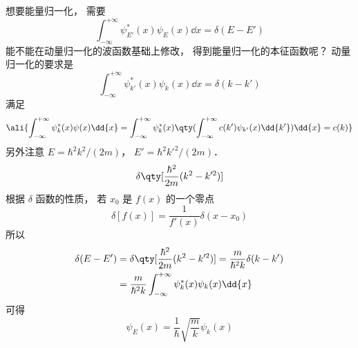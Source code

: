 想要能量归一化， 需要
\begin{equation}
\int_{-\infty}^{+\infty} \psi_{E'}^*(x) \psi_E(x) \dd{x}  = \delta (E - E')
\end{equation}
能不能在动量归一化的波函数基础上修改， 得到能量归一化的本征函数呢？
动量归一化的要求是
\begin{equation}
\int_{-\infty}^{+\infty} \psi_{k'}^*(x) \psi_k(x) \dd{x}  = \delta(k - k')
\end{equation}
满足
\begin{equation}\ali{
\int_{-\infty}^{+\infty} \psi_k^*(x) \psi(x) \dd{x}
= \int_{-\infty}^{+\infty} \psi_k^*(x) \qty(\int_{-\infty}^{+\infty} c(k')\psi_{k'}(x) \dd{k'}) \dd{x}
= c(k)
}\end{equation}
另外注意 $E = \hbar ^2 k^2/(2m)$， $E' = \hbar^2k'^2/(2m)$． 
\begin{equation}
\delta \qty[ \frac{\hbar ^2}{2m}(k^2 - k'^2)]
\end{equation}
根据 $\delta $ 函数的性质， 若 $x_0$ 是 $f(x)$ 的一个零点
\begin{equation}
\delta[f(x)] = \frac{1}{f'(x)}\delta (x - x_0)
\end{equation}
所以
\begin{equation}
\begin{aligned}
\delta (E - E') & = \delta \qty[\frac{\hbar^2}{2m}(k^2 - k'^2)] = \frac{m}{\hbar ^2 k}\delta (k - k') \\
&= \frac{m}{\hbar^2 k}\int_{-\infty }^{+\infty } \psi_k^*(x) \psi_k(x)\dd{x} 
\end{aligned}
\end{equation}
可得
\begin{equation}
\psi_E (x) = \frac{1}{\hbar} \sqrt{\frac{m}{k}} \psi_k(x)
\end{equation}

